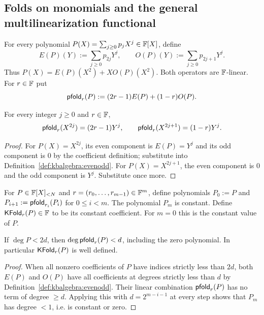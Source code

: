 \subsection{Folds on monomials and the general multilinearization functional}\label{sec:kbalgebra:dual}

\begin{definition}\label{def:kbalgebra:evenodd}
For every polynomial $P(X)=\sum_{j\geq0}p_jX^j\in\mathbb{F}[X]$, define
\[
 E(P)(Y):=\sum_{j\geq0}p_{2j}Y^j,
 \qquad O(P)(Y):=\sum_{j\geq0}p_{2j+1}Y^j.
\]
Thus $P(X)=E(P)(X^2)+XO(P)(X^2)$. Both operators are $\mathbb{F}$-linear. For $r\in\mathbb{F}$ put
\[
 \mathsf{pfold}_r(P):=(2r-1)E(P)+(1-r)O(P).
\]
\end{definition}

\begin{lemma}\label{lem:kbalgebra:monomial-fold}
For every integer $j\geq0$ and $r\in\mathbb{F}$,
\[
 \mathsf{pfold}_r(X^{2j})=(2r-1)Y^j,
 \qquad \mathsf{pfold}_r(X^{2j+1})=(1-r)Y^j.
\]
\end{lemma}
\begin{proof}
For $P(X)=X^{2j}$, its even component is $E(P)=Y^j$ and its odd component is $0$ by the coefficient definition; substitute into Definition~\ref{def:kbalgebra:evenodd}. For $P(X)=X^{2j+1}$, the even component is $0$ and the odd component is $Y^j$. Substitute once more.
\end{proof}

\begin{definition}\label{def:kbalgebra:complete-fold}
For $P\in\mathbb{F}[X]_{<N}$ and $r=(r_0,\ldots,r_{m-1})\in\mathbb{F}^m$, define polynomials $P_0:=P$ and $P_{i+1}:=\mathsf{pfold}_{r_i}(P_i)$ for $0\leq i<m$. The polynomial $P_m$ is constant. Define $\mathsf{KFold}_r(P)\in\mathbb{F}$ to be its constant coefficient. For $m=0$ this is the constant value of $P$.
\end{definition}

\begin{lemma}\label{lem:kbalgebra:halving}
If $\deg P<2d$, then $\deg\mathsf{pfold}_r(P)<d$, including the zero polynomial. In particular $\mathsf{KFold}_r(P)$ is well defined.
\end{lemma}
\begin{proof}
When all nonzero coefficients of $P$ have indices strictly less than $2d$, both $E(P)$ and $O(P)$ have all coefficients at degrees strictly less than $d$ by Definition~\ref{def:kbalgebra:evenodd}. Their linear combination $\mathsf{pfold}_r(P)$ has no term of degree $\geq d$. Applying this with $d=2^{m-i-1}$ at every step shows that $P_m$ has degree $<1$, i.e. is constant or zero.
\end{proof}

